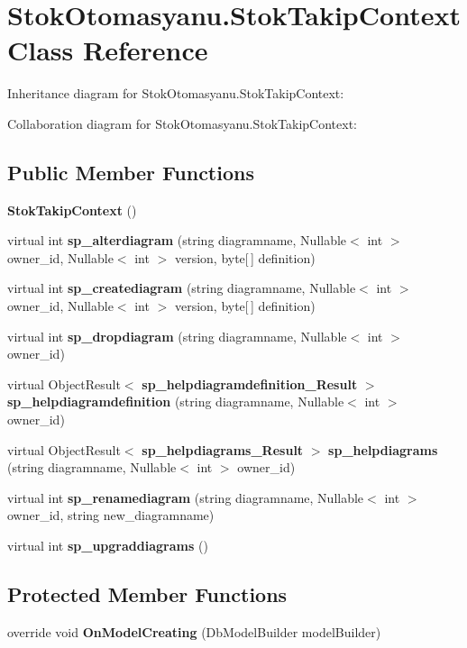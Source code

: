 \section{Stok\+Otomasyanu.\+Stok\+Takip\+Context Class Reference}
\label{class_stok_otomasyanu_1_1_stok_takip_context}


Inheritance diagram for Stok\+Otomasyanu.\+Stok\+Takip\+Context\+:


Collaboration diagram for Stok\+Otomasyanu.\+Stok\+Takip\+Context\+:
\subsection*{Public Member Functions}
\begin{DoxyCompactItemize}
\item 
\textbf{ Stok\+Takip\+Context} ()
\item 
virtual int \textbf{ sp\+\_\+alterdiagram} (string diagramname, Nullable$<$ int $>$ owner\+\_\+id, Nullable$<$ int $>$ version, byte[$\,$] definition)
\item 
virtual int \textbf{ sp\+\_\+creatediagram} (string diagramname, Nullable$<$ int $>$ owner\+\_\+id, Nullable$<$ int $>$ version, byte[$\,$] definition)
\item 
virtual int \textbf{ sp\+\_\+dropdiagram} (string diagramname, Nullable$<$ int $>$ owner\+\_\+id)
\item 
virtual Object\+Result$<$ \textbf{ sp\+\_\+helpdiagramdefinition\+\_\+\+Result} $>$ \textbf{ sp\+\_\+helpdiagramdefinition} (string diagramname, Nullable$<$ int $>$ owner\+\_\+id)
\item 
virtual Object\+Result$<$ \textbf{ sp\+\_\+helpdiagrams\+\_\+\+Result} $>$ \textbf{ sp\+\_\+helpdiagrams} (string diagramname, Nullable$<$ int $>$ owner\+\_\+id)
\item 
virtual int \textbf{ sp\+\_\+renamediagram} (string diagramname, Nullable$<$ int $>$ owner\+\_\+id, string new\+\_\+diagramname)
\item 
virtual int \textbf{ sp\+\_\+upgraddiagrams} ()
\end{DoxyCompactItemize}
\subsection*{Protected Member Functions}
\begin{DoxyCompactItemize}
\item 
override void \textbf{ On\+Model\+Creating} (Db\+Model\+Builder model\+Builder)
\end{DoxyCompactItemize}
